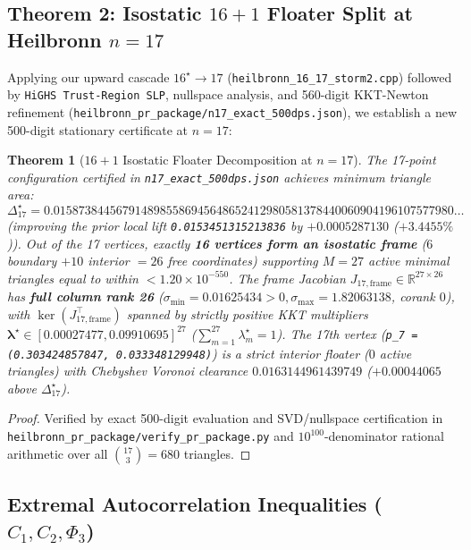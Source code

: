 \documentclass[11pt,a4paper]{article}
\newtheorem{theorem}{Theorem}
\begin{document}
\subsection{Theorem 2: Isostatic $16 + 1$ Floater Split at Heilbronn $n = 17$}

Applying our upward cascade $16^\star \to 17$ (\texttt{heilbronn\_16\_17\_storm2.cpp}) followed by \texttt{HiGHS Trust-Region SLP}, nullspace analysis, and 560-digit KKT-Newton refinement (\texttt{heilbronn\_pr\_package/n17\_exact\_500dps.json}), we establish a new 500-digit stationary certificate at $n = 17$:

\begin{theorem}[$16+1$ Isostatic Floater Decomposition at $n = 17$]
\label{thm:heilbronn_n17}
The 17-point configuration certified in \texttt{n17\_exact\_500dps.json} achieves minimum triangle area:
\begin{equation}
\Delta_{17}^\star = \mathbf{0.0158738445679148985586945648652412980581378440060904196107577980\dots}
\tag{19}\label{eq:heilbronn_n17}
\end{equation}
(improving the prior local lift \texttt{0.0153451315213836} by $\mathbf{+0.0005287130}$ ($\mathbf{+3.4455\%}$)). Out of the 17 vertices, exactly \textbf{16 vertices form an isostatic frame} ($6$ boundary $+ 10$ interior $= 26$ free coordinates) supporting $M = 27$ active minimal triangles equal to within $< 1.20 \times 10^{-550}$. The frame Jacobian $J_{17,\text{frame}} \in \mathbb{R}^{27 \times 26}$ has \textbf{full column rank 26} ($\sigma_{\min} = 0.01625434 > 0, \sigma_{\max} = 1.82063138$, corank $0$), with $\ker(J_{17,\text{frame}}^\top)$ spanned by strictly positive KKT multipliers $\boldsymbol{\lambda}^\star \in [0.00027477, 0.09910695]^{27}$ ($\sum_{m=1}^{27}\lambda_m^\star = 1$). The 17th vertex (\texttt{p\_7 = (0.303424857847, 0.033348129948)}) is a strict interior floater ($0$ active triangles) with Chebyshev Voronoi clearance $\mathbf{0.0163144961439749}$ ($+0.00044065$ above $\Delta_{17}^\star$).
\end{theorem}
\begin{proof}
Verified by exact 500-digit evaluation and SVD/nullspace certification in \texttt{heilbronn\_pr\_package/verify\_pr\_package.py} and $10^{100}$-denominator rational arithmetic over all $\binom{17}{3} = 680$ triangles.
\end{proof}

\subsection{Extremal Autocorrelation Inequalities ($C_1, C_2, \Phi_3$)}
\end{document}
